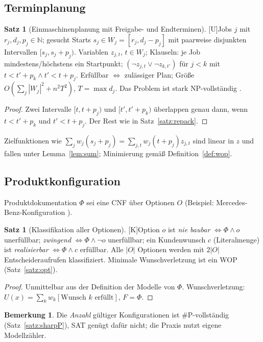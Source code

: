 \documentclass[a4paper,12pt]{article}
\theoremstyle{definition}
\newtheorem{satz}[definition]{Satz}
\newtheorem{bemerkung}[definition]{Bemerkung}
\newcommand{\tU}{\textsf{\small[U]}}   %
\newcommand{\tK}{\textsf{\small[K]}}   %
\newcommand{\NN}{\mathbb{N}}
\newcommand{\cNP}{\ensuremath{\mathrm{NP}}}
\newcommand{\sharpP}{\ensuremath{\#\mathrm{P}}}
\begin{document}
\subsection{Terminplanung}
\begin{satz}[Einmaschinenplanung mit Freigabe- und Endterminen]\tU\label{satz:sched}
Jobs \(j\) mit \(r_j,d_j,p_j\in\NN\); gesucht Starts \(s_j\in W_j=[r_j,d_j-p_j]\) mit paarweise disjunkten Intervallen \([s_j,s_j+p_j)\). Variablen \(z_{j,t}\), \(t\in W_j\); Klauseln: je Job mindestens/höchstens ein Startpunkt; \((\neg z_{j,t}\vee\neg z_{k,t'})\) für \(j<k\) mit \(t<t'+p_k\wedge t'<t+p_j\). Erfüllbar \(\iff\) zulässiger Plan; Größe \(O(\sum_j|W_j|^2+n^2T^2)\), \(T=\max d_j\). Das Problem ist stark \(\cNP\)-vollständig \cite{lenstra1977}.
\end{satz}
\begin{proof}
Zwei Intervalle \([t,t+p_j)\) und \([t',t'+p_k)\) überlappen genau dann, wenn \(t<t'+p_k\) und \(t'<t+p_j\). Der Rest wie in Satz~\ref{satz:repack}.
\end{proof}
Zielfunktionen wie \(\sum_jw_j(s_j+p_j)=\sum_{j,t}w_j(t+p_j)z_{j,t}\) sind linear in \(z\) und fallen unter Lemma~\ref{lem:sum}; Minimierung gemäß Definition~\ref{def:wop}.

\subsection{Produktkonfiguration}
Produktdokumentation \(\Phi\) sei eine CNF über Optionen \(O\) (Beispiel: Mercedes-Benz-Konfiguration \cite{sinz2003}).
\begin{satz}[Klassifikation aller Optionen]\tK\label{satz:config}
Option \(o\) ist \emph{nie baubar} \(\iff\Phi\wedge o\) unerfüllbar; \emph{zwingend} \(\iff\Phi\wedge\neg o\) unerfüllbar; ein Kundenwunsch \(c\) (Literalmenge) ist \emph{realisierbar} \(\iff\Phi\wedge c\) erfüllbar. Alle \(|O|\) Optionen werden mit \(2|O|\) Entscheideraufrufen klassifiziert. Minimale Wunschverletzung ist ein WOP (Satz~\ref{satz:opt}).
\end{satz}
\begin{proof}
Unmittelbar aus der Definition der Modelle von \(\Phi\). Wunschverletzung: \(U(x)=\sum_k w_k[\text{Wunsch }k\text{ erfüllt}]\), \(F=\Phi\).
\end{proof}
\begin{bemerkung}
Die \emph{Anzahl} gültiger Konfigurationen ist \(\sharpP\)-vollständig (Satz~\ref{satz:sharpP}), SAT genügt dafür nicht; die Praxis nutzt eigene Modellzähler.
\end{bemerkung}
\end{document}
